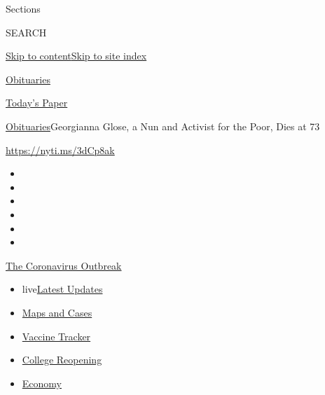 Sections

SEARCH

\protect\hyperlink{site-content}{Skip to
content}\protect\hyperlink{site-index}{Skip to site index}

\href{https://www.nytimes3xbfgragh.onion/section/obituaries}{Obituaries}

\href{https://myaccount.nytimes3xbfgragh.onion/auth/login?response_type=cookie\&client_id=vi}{}

\href{https://www.nytimes3xbfgragh.onion/section/todayspaper}{Today's
Paper}

\href{/section/obituaries}{Obituaries}\textbar{}Georgianna Glose, a Nun
and Activist for the Poor, Dies at 73

\url{https://nyti.ms/3dCp8ak}

\begin{itemize}
\item
\item
\item
\item
\item
\item
\end{itemize}

\href{https://www.nytimes3xbfgragh.onion/news-event/coronavirus?action=click\&pgtype=Article\&state=default\&region=TOP_BANNER\&context=storylines_menu}{The
Coronavirus Outbreak}

\begin{itemize}
\tightlist
\item
  live\href{https://www.nytimes3xbfgragh.onion/2020/08/04/world/coronavirus-covid-19.html?action=click\&pgtype=Article\&state=default\&region=TOP_BANNER\&context=storylines_menu}{Latest
  Updates}
\item
  \href{https://www.nytimes3xbfgragh.onion/interactive/2020/us/coronavirus-us-cases.html?action=click\&pgtype=Article\&state=default\&region=TOP_BANNER\&context=storylines_menu}{Maps
  and Cases}
\item
  \href{https://www.nytimes3xbfgragh.onion/interactive/2020/science/coronavirus-vaccine-tracker.html?action=click\&pgtype=Article\&state=default\&region=TOP_BANNER\&context=storylines_menu}{Vaccine
  Tracker}
\item
  \href{https://www.nytimes3xbfgragh.onion/2020/08/02/us/covid-college-reopening.html?action=click\&pgtype=Article\&state=default\&region=TOP_BANNER\&context=storylines_menu}{College
  Reopening}
\item
  \href{https://www.nytimes3xbfgragh.onion/live/2020/08/03/business/stock-market-today-coronavirus?action=click\&pgtype=Article\&state=default\&region=TOP_BANNER\&context=storylines_menu}{Economy}
\end{itemize}

